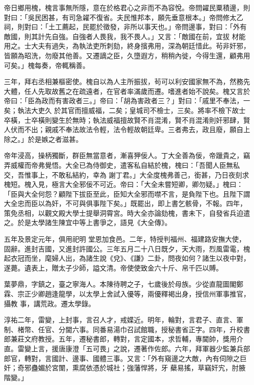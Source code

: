 \begin{pinyinscope}
 帝日鄉用槐，槐言事無所隱，意在於格君心之非而不為容悅。帝問糴民粟積邊，則對曰：「吳民困甚，有司急糴不復省。夫民惟邦本，願先垂意根本。」帝問修太乙祠，則對曰：「土工薦起，民罷於徵發，非所以事天也。」帝問邊事，對曰：「外有敵國，則其計先自強。自強者人畏我，我不畏人。」又言：「敵國在前，宜拔
 材能用之。士大夫有過失，為執法吏所刺劾，終身擯弗用，深為朝廷惜此。茍非奸邪，皆願為昭洗，勿廢其他善。又遷謫之臣，久墮遐方，稍稍內徙，今得生還，顧弗用可矣。」槐每奏，帝輒稱善。



 三年，拜右丞相兼樞密使。槐自以為人主所振拔，茍可以利安國家無不為，然務先大體，任人先取故舊之在疏遠者，在官者率滿歲而遷。嗜進者始不說矣。槐又言於帝曰：「臣為政而有害政者三。」帝曰：「胡為害政者三？」對曰：「戚里不奉法，一矣；執法大吏久
 於其官而擅威福，二矣；皇城司不檢士，三矣。將率不檢下故士卒橫，士卒橫則變生於無時；執法威福擅故賢不肖混淆，賢不肖混淆則奸邪肆，賢人伏而不出；親戚不奉法故法令輕，法令輕故朝廷卑。三者弗去，政且廢，願自上除之。」於是嫉之者滋甚。



 帝年浸高，操柄獨斷，群臣無當意者，漸喜狎佞人。丁大全善為佞，帝躐貴之，竊弄威權而帝弗覺悟。大全已為侍御史，遣客私自結於槐，槐曰：「吾聞人臣無私交，吾惟事上，不敢私結約，幸為
 謝丁君。」大全度槐弗善己，銜甚，乃日夜刻求槐短。槐入見，極言大全邪佞不可近。帝曰：「大全未嘗短卿，卿勿疑。」槐曰：「臣與大全何怨？顧陛下拔臣至此，臣知大全邪而噤不言，是負陛下也。且陛下謂大全忠而臣以為奸，不可與俱事陛下矣。」既罷出，即上書乞骸骨，不報。四年，策免丞相，以觀文殿大學士提舉洞霄宮。時大全亦論劾槐，書未下，自發省兵迫遣之。於是太學諸生陳宜中等上書爭之，語見《大全傳》。



 五年及景定元年，俱用祀明
 堂恩加食邑。二年，特授判福州、福建路安撫大使，固辭。進封吉國，又進封許國公。三年五月二十八日既夕，天大雨，烈風雷電，槐起衣冠而坐，麾婦人出，為諸生說《兌》、《謙》二卦，問夜如何？諸生以夜中對，遂薨。遺表上，贈太子少師，謚文清。帝使使致金六十斤、帛千匹以賻。



 葉夢鼎，字鎮之，臺之寧海人。本陳待聘之子，七歲後於母族。少從直龍圖閣鄭霖、宗正少卿趙逢龍學，以太學上舍試入優等，兩優釋褐出身，授信州軍事推官，攝教
 事，講荒政。遷太學錄。



 淳祐二年，雷變，上封事，言召人才，戒媟近。明年，輪對，言君子、直言、軍制、楮幣、任官、分閫六事。同番易湯巾召試館職，授秘書省正字。四年，升校書郎兼莊文府教授。五年，遷秘書郎，轉對，言定國本，求哲輔，專閫帥，獎用介直。雷變上言，援唐康澄「五可畏」之說，遷著作佐郎。六年，拜軍器少監兼兵部郎官，轉對，言國計、邊事、國體三事。又言：「外有窺邊之大敵，內有伺隙之巨奸；奇邪蠱媚於宮闈，熏腐依憑於城社；強藩悍將，牙
 蘗易搖，草竊奸宄，肘腋階變。」




\end{pinyinscope}

